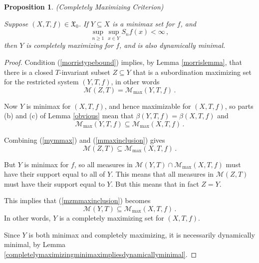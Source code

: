 \documentclass[reqno,11pt]{amsart}
\newtheorem{prop}[thm]{Proposition}
\theoremstyle{definition}
\theoremstyle{remark}
\theoremstyle{remark}
\def\m{\mathcal M}
\def\X{\mathfrak{X}}
\numberwithin{equation}{section}
\begin{document}
\begin{prop}\label{morrisminimaxcompletely} (Completely Maximizing Criterion)
 
\noindent Suppose $(X,T,f)\in\X_0$.
If $Y\subseteq X$ is a minimax set for $f$, and
\begin{equation}\label{morristypebound}
\sup_{n\ge 1} \sup_{x\in Y} S_nf(x) < \infty\,,
\end{equation}
then $Y$ is completely maximizing for $f$,
and is also dynamically minimal.
\end{prop}
\begin{proof}
Condition (\ref{morristypebound}) implies, by Lemma \ref{morrislemma}, that 
there is a closed $T$-invariant subset $Z\subseteq Y$ that is a subordination maximizing set 
for the restricted system $(Y,T,f)$, in other words
\begin{equation}\label{mymmax}
\m(Z,T)= \m_{\max}(Y, T,f)\,.
\end{equation}

Now $Y$ is minimax for $(X,T,f)$, and hence maximizable for $(X,T,f)$, so
parts  (b) and (c) of
Lemma \ref{obvious} mean that
$\beta(Y,T,f) = \beta(X,T,f)$ and
\begin{equation}\label{mmaxinclusion}
\m_{\max}(Y, T,f) \subseteq  \m_{\max}(X, T,f)\,.
\end{equation}

Combining (\ref{mymmax}) and (\ref{mmaxinclusion}) gives
\begin{equation}\label{mzmmaxinclusion}
\m(Z,T) \subseteq  \m_{\max}(X, T,f)\,.
\end{equation}

But $Y$ is minimax for $f$, so all measures in $\m(Y,T)\cap\m_{\max}(X,T,f)$ must have 
their support equal to all of $Y$.
This means that all measures in $\m(Z,T)$ must have their support equal to $Y$.
But this means that in fact
$Z=Y$.

This implies that (\ref{mzmmaxinclusion}) becomes
\begin{equation*}
\m(Y,T) \subseteq  \m_{\max}(X, T,f)\,.
\end{equation*}
In other words, $Y$ is a completely maximizing set for $(X,T,f)$.

Since $Y$ is both minimax and completely maximizing, it is necessarily dynamically minimal, by
Lemma \ref{completelymaximizingminimaximpliesdynamicallyminimal}.
\end{proof}
\end{document}
